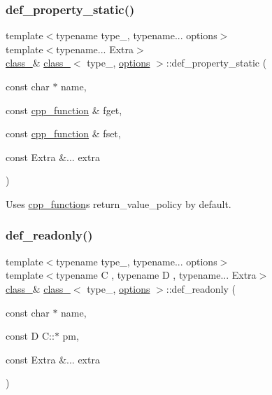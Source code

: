 \subsubsection{\texorpdfstring{def\_property\_static()}{def\_property\_static()}\hspace{0.1cm}{\footnotesize\ttfamily [2/2]}}
{\footnotesize\ttfamily template$<$typename type\+\_\+, typename... options$>$ \\
template$<$typename... Extra$>$ \\
\mbox{\hyperlink{classclass__}{class\+\_\+}}\& \mbox{\hyperlink{classclass__}{class\+\_\+}}$<$ type\+\_\+, \mbox{\hyperlink{classoptions}{options}} $>$\+::def\+\_\+property\+\_\+static (\begin{DoxyParamCaption}\item[{const char $\ast$}]{name,  }\item[{const \mbox{\hyperlink{classcpp__function}{cpp\+\_\+function}} \&}]{fget,  }\item[{const \mbox{\hyperlink{classcpp__function}{cpp\+\_\+function}} \&}]{fset,  }\item[{const Extra \&...}]{extra }\end{DoxyParamCaption})\hspace{0.3cm}{\ttfamily [inline]}}



Uses \mbox{\hyperlink{classcpp__function}{cpp\+\_\+function}}\textquotesingle{}s return\+\_\+value\+\_\+policy by default. 

\mbox{\label{classclass___ac98b5db2ad54da585cc9d28a8748e420}} 
\subsubsection{\texorpdfstring{def\_readonly()}{def\_readonly()}}
{\footnotesize\ttfamily template$<$typename type\+\_\+, typename... options$>$ \\
template$<$typename C , typename D , typename... Extra$>$ \\
\mbox{\hyperlink{classclass__}{class\+\_\+}}\& \mbox{\hyperlink{classclass__}{class\+\_\+}}$<$ type\+\_\+, \mbox{\hyperlink{classoptions}{options}} $>$\+::def\+\_\+readonly (\begin{DoxyParamCaption}\item[{const char $\ast$}]{name,  }\item[{const D C\+::$\ast$}]{pm,  }\item[{const Extra \&...}]{extra }\end{DoxyParamCaption})\hspace{0.3cm}{\ttfamily [inline]}}

